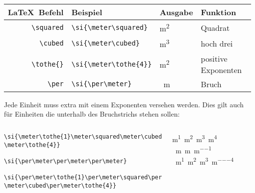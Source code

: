 \begin{frame}[fragile]
	\begin{center}
		\begin{tabular}{r|ll|l}
			\toprule
			\LaTeX\ Befehl				& Beispiel		&Ausgabe	&	Funktion								\\ \midrule
			\lstinline|\squared|	&	\lstinline|\si{\meter\squared}| &\si{\meter\squared}			&	Quadrat 				\\
						\lstinline|\cubed|	&	\lstinline|\si{\meter\cubed}| &\si{\meter\cubed}			&	hoch drei				\\
			\lstinline/\tothe{}/			&	\lstinline|\si{\meter\tothe{4}}|	& \si{\meter\tothe{2}}				&	 positive Exponenten					\\
			\lstinline/\per/			&	\lstinline|\si{\per\meter}|& \si{\per\meter}				&	 	Bruch			\\
			\bottomrule
		\end{tabular}
	\end{center}
Jede Einheit muss extra mit einem Exponenten versehen werden. Dies gilt auch für Einheiten die unterhalb des Bruchstrichs stehen sollen:
	\vspace{12px}
\begin{columns}[c]
\begin{lstlisting}
\si{\meter\tothe{1}\meter\squared\meter\cubed
\meter\tothe{4}}

\si{\per\meter\per\meter\per\meter}

\si{\per\meter\tothe{1}\per\meter\squared\per
\meter\cubed\per\meter\tothe{4}}
\end{lstlisting}
\begin{outputbox}
	\begin{center}
		\vspace{3px}
\si{\meter\tothe{1}\meter\squared\meter\cubed\meter\tothe{4}} \\
\vspace{10px}
\si{\per\meter\per\meter\per\meter} \\
\vspace{10px}
\si{\per\meter\tothe{1}\per\meter\squared\per\meter\cubed\per\meter\tothe{4}}
	\end{center}
\end{outputbox}
\end{columns}
\end{frame}

